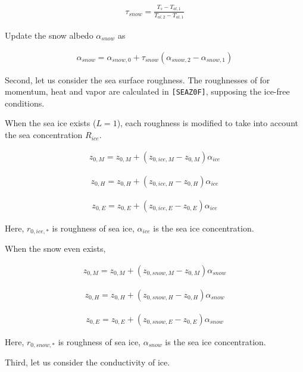 \begin{eqnarray}
\tau_{snow} = \frac{T_s - T_{al,1}}{T_{al,2}-T_{al,1}}
\end{eqnarray}

Update the snow albedo \(\alpha_{snow}\) as

\begin{eqnarray}
    \alpha_{snow} = \alpha_{snow,0} + \tau_{snow}(\alpha_{snow,2}-\alpha_{snow,1})
\end{eqnarray}

Second, let us consider the sea surface roughness. The roughnesses of
for momentum, heat and vapor are calculated in \texttt{{[}SEAZ0F{]}},
supposing the ice-free conditions.

When the sea ice exists (\(L=1\)), each roughness is modified to take
into account the sea concentration \(R_{ice}\).

\begin{eqnarray}
    z_{0,M} = z_{0,M} + ( z_{0,ice,M} - z_{0,M})  \alpha_{ice}
\end{eqnarray}

\begin{eqnarray}
    z_{0,H} = z_{0,H} + ( z_{0,ice,H} - z_{0,H})  \alpha_{ice}
\end{eqnarray}

\begin{eqnarray}
    z_{0,E} = z_{0,E} + ( z_{0,ice,E} - z_{0,E})  \alpha_{ice}
\end{eqnarray}

Here, \(r_{0,ice,*}\) is roughness of sea ice, \(\alpha_{ice}\) is the
sea ice concentration.

When the snow even exists,

\begin{eqnarray}
    z_{0,M} = z_{0,M} + ( z_{0,snow,M} - z_{0,M})  \alpha_{snow}
\end{eqnarray}

\begin{eqnarray}
    z_{0,H} = z_{0,H} + ( z_{0,snow,H} - z_{0,H})  \alpha_{snow}
\end{eqnarray}

\begin{eqnarray}
    z_{0,E} = z_{0,E} + ( z_{0,snow,E} - z_{0,E})  \alpha_{snow}
\end{eqnarray}

Here, \(r_{0,snow,*}\) is roughness of sea ice, \(\alpha_{snow}\) is the
sea ice concentration.

Third, let us consider the conductivity of ice.

